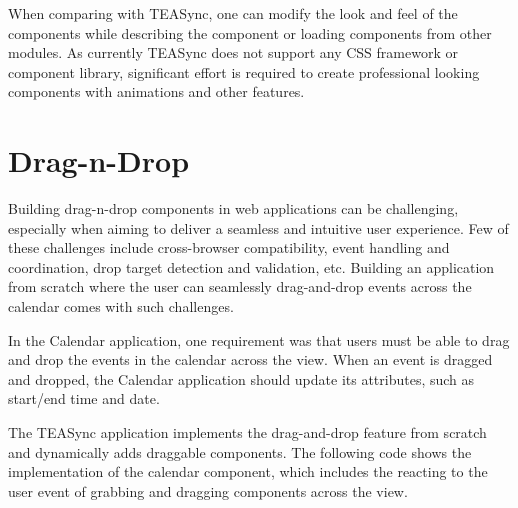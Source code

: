 When comparing with TEASync, one can modify the look and feel of the components while describing the component or loading components from other modules. As currently TEASync does not support any CSS framework or component library, significant effort is required to create professional looking components with animations and other features. 



\section{Drag-n-Drop}
Building drag-n-drop components in web applications can be challenging, especially when aiming to deliver a seamless and intuitive user experience. Few of these challenges include cross-browser compatibility, event handling and coordination, drop target detection and validation, etc. Building an application from scratch where the user can seamlessly drag-and-drop events across the calendar comes with such challenges.

In the Calendar application, one requirement was that users must be able to drag and drop the events in the calendar across the view. When an event is dragged and dropped, the Calendar application should update its attributes, such as start/end time and date.

The TEASync application implements the drag-and-drop feature from scratch and dynamically adds draggable components. The following code shows the implementation of the calendar component, which includes the reacting to the user event of grabbing and dragging components across the view.

